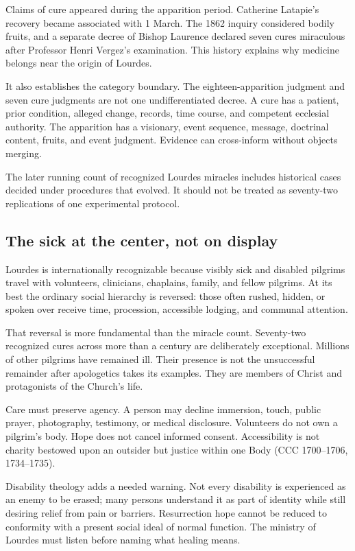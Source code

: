 Claims of cure appeared during the apparition period. Catherine Latapie's recovery became associated with 1 March. The 1862 inquiry considered bodily fruits, and a separate decree of Bishop Laurence declared seven cures miraculous after Professor Henri Vergez's examination. This history explains why medicine belongs near the origin of Lourdes.

It also establishes the category boundary. The eighteen-apparition judgment and seven cure judgments are not one undifferentiated decree. A cure has a patient, prior condition, alleged change, records, time course, and competent ecclesial authority. The apparition has a visionary, event sequence, message, doctrinal content, fruits, and event judgment. Evidence can cross-inform without objects merging.

The later running count of recognized Lourdes miracles includes historical cases decided under procedures that evolved. It should not be treated as seventy-two replications of one experimental protocol.

\subsection{The sick at the center, not on display}

Lourdes is internationally recognizable because visibly sick and disabled pilgrims travel with volunteers, clinicians, chaplains, family, and fellow pilgrims. At its best the ordinary social hierarchy is reversed: those often rushed, hidden, or spoken over receive time, procession, accessible lodging, and communal attention.

That reversal is more fundamental than the miracle count. Seventy-two recognized cures across more than a century are deliberately exceptional. Millions of other pilgrims have remained ill. Their presence is not the unsuccessful remainder after apologetics takes its examples. They are members of Christ and protagonists of the Church's life.

Care must preserve agency. A person may decline immersion, touch, public prayer, photography, testimony, or medical disclosure. Volunteers do not own a pilgrim's body. Hope does not cancel informed consent. Accessibility is not charity bestowed upon an outsider but justice within one Body (CCC 1700--1706, 1734--1735).

Disability theology adds a needed warning. Not every disability is experienced as an enemy to be erased; many persons understand it as part of identity while still desiring relief from pain or barriers. Resurrection hope cannot be reduced to conformity with a present social ideal of normal function. The ministry of Lourdes must listen before naming what healing means.

